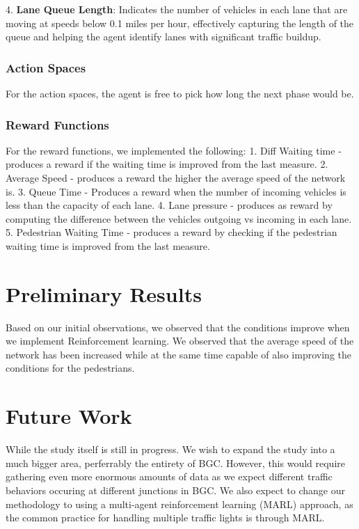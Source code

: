 4. \textbf{Lane Queue Length}: Indicates the number of vehicles in each lane that are moving at speeds below 0.1 miles per hour, effectively capturing the length of the queue and helping the agent identify lanes with significant traffic buildup.

\subsubsection{Action Spaces}
For the action spaces, the agent is free to pick how long the next phase would be.

\subsubsection{Reward Functions}
For the reward functions, we implemented the following:
1. Diff Waiting time - produces a reward if the waiting time is improved from the last measure.
2. Average Speed - produces a reward the higher the average speed of the network is.
3. Queue Time - Produces a reward when the number of incoming vehicles is less than the capacity of each lane.
4. Lane pressure - produces as reward by computing the difference between the vehicles outgoing vs incoming in each lane.
5. Pedestrian Waiting Time - produces a reward by checking if the pedestrian waiting time is improved from the last measure.

\section{Preliminary Results}

Based on our initial observations, we observed that the conditions improve when we implement Reinforcement learning. We observed that the average speed of the network has been increased while at the same time capable of also improving the conditions for the pedestrians.


\section{Future Work}

While the study itself is still in progress. We wish to expand the study into a much bigger area, perferrably the entirety of BGC. However, this would require gathering even more enormous amounts of data as we expect different traffic behaviors occuring at different junctions in BGC. We also expect to change our methodology to using a multi-agent reinforcement learning (MARL) approach, as the common practice for handling multiple traffic lights is through MARL.

